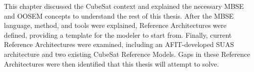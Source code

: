 This chapter discussed the CubeSat context and explained the necessary MBSE and OOSEM concepts to understand the rest of this thesis. After the MBSE language, method, and tools were explained, Reference Architectures were defined, providing a template for the modeler to start from. Finally, current Reference Architectures were examined, including an AFIT-developed SUAS architecture and two existing CubeSat Reference Models. Gaps in these Reference Architectures were then identified that this thesis will attempt to solve. 